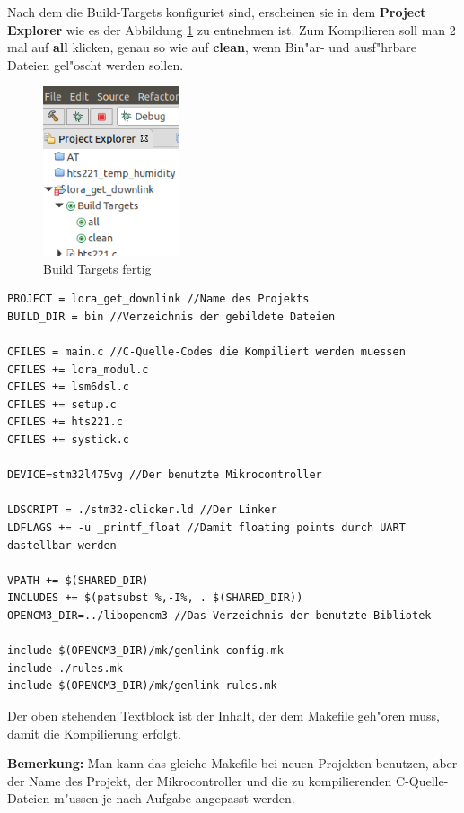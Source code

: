 Nach dem die Build-Targets konfiguriet sind, erscheinen sie in dem 
\textbf{Project Explorer} wie es der Abbildung \ref{fig:build2} zu 
entnehmen ist. Zum Kompilieren soll man 2 mal auf \textbf{all} klicken, 
genau so wie auf \textbf{clean}, wenn Bin"ar- und ausf"hrbare Dateien 
gel"oscht werden sollen. 

\begin{figure}[h]
	\centering
	\includegraphics[width=4cm]{source/images/Build2}
	\caption{Build Targets fertig\label{fig:build2}}
\end{figure}

 \vspace{1cm}
\begin{lstlisting}[frame=single]
PROJECT = lora_get_downlink //Name des Projekts
BUILD_DIR = bin //Verzeichnis der gebildete Dateien

CFILES = main.c //C-Quelle-Codes die Kompiliert werden muessen
CFILES += lora_modul.c
CFILES += lsm6dsl.c
CFILES += setup.c
CFILES += hts221.c
CFILES += systick.c

DEVICE=stm32l475vg //Der benutzte Mikrocontroller

LDSCRIPT = ./stm32-clicker.ld //Der Linker
LDFLAGS += -u _printf_float //Damit floating points durch UART dastellbar werden

VPATH += $(SHARED_DIR)
INCLUDES += $(patsubst %,-I%, . $(SHARED_DIR))
OPENCM3_DIR=../libopencm3 //Das Verzeichnis der benutzte Bibliotek

include $(OPENCM3_DIR)/mk/genlink-config.mk
include ./rules.mk
include $(OPENCM3_DIR)/mk/genlink-rules.mk

\end{lstlisting}
Der oben stehenden Textblock ist der Inhalt, der dem Makefile geh"oren 
muss, damit die Kompilierung erfolgt.
 
\textbf{Bemerkung:} Man kann das gleiche Makefile bei neuen Projekten 
benutzen, aber der Name des Projekt, der Mikrocontroller und die zu 
kompilierenden C-Quelle-Dateien  m"ussen je nach Aufgabe angepasst 
werden.   

